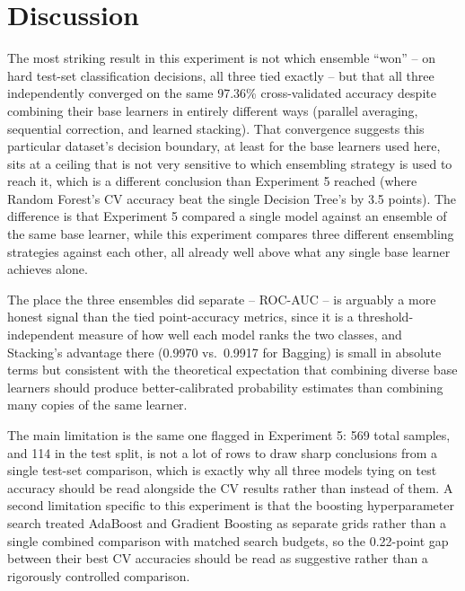 \documentclass[11pt,a4paper]{article}
\begin{document}
\section{Discussion}
The most striking result in this experiment is not which ensemble ``won'' -- on hard test-set classification decisions, all three tied exactly -- but that all three independently converged on the same 97.36\% cross-validated accuracy despite combining their base learners in entirely different ways (parallel averaging, sequential correction, and learned stacking). That convergence suggests this particular dataset's decision boundary, at least for the base learners used here, sits at a ceiling that is not very sensitive to which ensembling strategy is used to reach it, which is a different conclusion than Experiment 5 reached (where Random Forest's CV accuracy beat the single Decision Tree's by 3.5 points). The difference is that Experiment 5 compared a single model against an ensemble of the same base learner, while this experiment compares three different ensembling strategies against each other, all already well above what any single base learner achieves alone.

The place the three ensembles did separate -- ROC-AUC -- is arguably a more honest signal than the tied point-accuracy metrics, since it is a threshold-independent measure of how well each model ranks the two classes, and Stacking's advantage there (0.9970 vs.\ 0.9917 for Bagging) is small in absolute terms but consistent with the theoretical expectation that combining diverse base learners should produce better-calibrated probability estimates than combining many copies of the same learner.

The main limitation is the same one flagged in Experiment 5: 569 total samples, and 114 in the test split, is not a lot of rows to draw sharp conclusions from a single test-set comparison, which is exactly why all three models tying on test accuracy should be read alongside the CV results rather than instead of them. A second limitation specific to this experiment is that the boosting hyperparameter search treated AdaBoost and Gradient Boosting as separate grids rather than a single combined comparison with matched search budgets, so the 0.22-point gap between their best CV accuracies should be read as suggestive rather than a rigorously controlled comparison.

\end{document}
